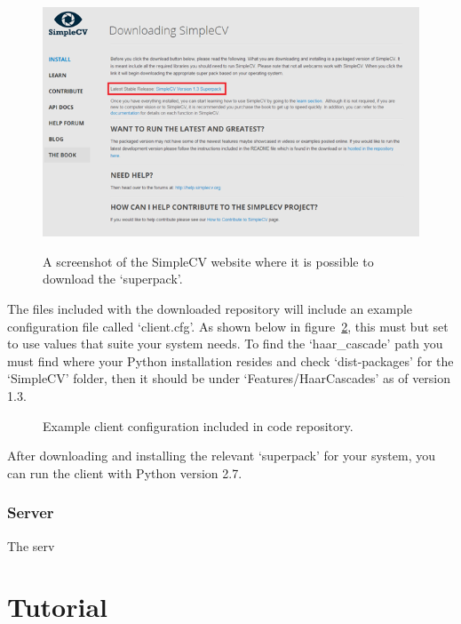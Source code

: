 \documentclass[a4paper]{article}
\begin{document}
        \begin{figure}[H]
            \centering
            \caption{A screenshot of the SimpleCV website where it is possible to download the `superpack'.}
                \includegraphics[scale=0.7]{../shared_assets/screenshots/manual/simplecv_download.png}
            \label{fig:simplecv}
        \end{figure}

        The files included with the downloaded repository will include an example configuration file called `client.cfg'. As shown
        below in figure~\ref{lst:clientcfg}, this must but set to use values that suite your system needs. To find the `haar\_cascade'
        path you must find where your Python installation resides and check `dist-packages' for the `SimpleCV' folder, then it should
        be under `Features/HaarCascades' as of version 1.3.

        \begin{figure}[H]
            \centering
            \caption{Example client configuration included in code repository.}
                
            \label{lst:clientcfg}
        \end{figure}

        After downloading and installing the relevant `superpack' for your system, you can run the client with Python version 2.7.

    \subsubsection{Server}
        The serv

\section{Tutorial}
\end{document}
